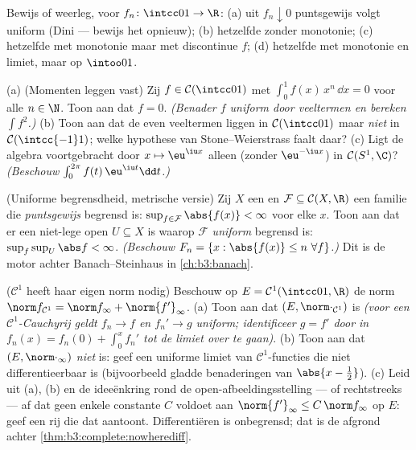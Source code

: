 \begin{exercise}[$\star\star$]\label{exo:b3:complete:8}
Bewijs of weerleg, voor  $f_n \colon \intcc01 \to \R$:
(a) uit $f_n \downarrow 0$ puntsgewijs volgt uniform (Dini ---
bewijs het opnieuw); (b) hetzelfde zonder monotonie; (c)
hetzelfde met monotonie maar met discontinue $f$; (d) hetzelfde
met monotonie en  limiet, maar op $\intoo01$.
\end{exercise}

\begin{exercise}[$\star\star$]\label{exo:b3:complete:9}
(a) (Momenten leggen vast) Zij $f \in \mathcal C(\intcc01)$ met
$\int_0^1 f(x)\,x^n\,\dd x = 0$ voor alle $n \in \N$. Toon aan dat
$f = 0$. \emph{(Benader $f$ uniform door veeltermen en bereken
$\int f^2$.)}
(b) Toon aan dat de even veeltermen  liggen in $\mathcal
C(\intcc01)$ maar \emph{niet} in $\mathcal C(\intcc{-1}1)$; welke
hypothese van Stone--Weierstrass faalt daar?
(c) Ligt de algebra voortgebracht door $x \mapsto \eu^{\iu x}$
alleen (zonder $\eu^{-\iu x}$)  in $\mathcal C(S^1, \C)$?
\emph{(Beschouw $\int_0^{2\pi}f(t)\,\eu^{\iu t}\dd t$.)}
\end{exercise}

\begin{exercise}[$\star\star\star$]\label{exo:b3:complete:10}
(Uniforme begrensdheid, metrische versie) Zij $X$ een  en $\mathcal F \subseteq \mathcal C(X, \R)$ een
familie die \emph{puntsgewijs} begrensd is: $\sup_{f \in \mathcal
F}\abs{f(x)} < \infty$ voor elke $x$. Toon aan dat er een
niet-lege open $U \subseteq X$ is waarop $\mathcal F$
\emph{uniform} begrensd is: $\sup_{f}\sup_U \abs f < \infty$.
\emph{(Beschouw $F_n = \{x : \abs{f(x)} \leq n\ \forall f\}$.)}
Dit is de motor achter Banach--Steinhaus in
\cref{ch:b3:banach}.
\end{exercise}

\begin{exercise}[$\star\star$]\label{exo:b3:complete:11}
($\mathcal C^1$ heeft haar eigen norm nodig) Beschouw op $E =
\mathcal C^1(\intcc01, \R)$ de norm $\norm f_{\mathcal C^1} =
\norm f_\infty + \norm{f'}_\infty$.
(a) Toon aan dat $(E, \norm\cdot_{\mathcal C^1})$  is
\emph{(voor een $\mathcal C^1$-Cauchyrij geldt $f_n \to f$ en
$f_n' \to g$ uniform; identificeer $g = f'$ door in $f_n(x) =
f_n(0) + \int_0^xf_n'$ tot de limiet over te gaan)}.
(b) Toon aan dat $(E, \norm\cdot_\infty)$ \emph{niet}  is:
geef een uniforme limiet van $\mathcal C^1$-functies die niet
differentieerbaar is (bijvoorbeeld gladde benaderingen van
$\abs{x - \tfrac12}$).
(c) Leid uit (a), (b) en de ideeënkring rond de
open-afbeeldingsstelling --- of rechtstreeks --- af dat geen
enkele constante $C$ voldoet aan $\norm{f'}_\infty \leq
C\,\norm f_\infty$ op $E$: geef een rij die dat aantoont.
Differentiëren is onbegrensd; dat is de afgrond achter
\cref{thm:b3:complete:nowherediff}.
\end{exercise}

